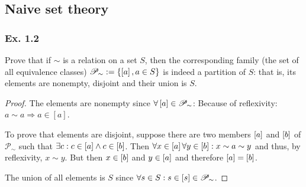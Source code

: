 \subsection{Naive set theory}
\subsubsection{Ex. 1.2}

Prove that if $\sim$ is a relation on a set $S$, then the corresponding family (the set of all equivalence classes) $\mathscr{P}_{\sim} := \left\{\left[a\right], a \in S\right\}
$ is indeed a partition of $S$: that is, its elements are nonempty, disjoint and their union is $S$.

\begin{proof}
    The elements are nonempty since
        $\forall \left[a\right] \in \mathscr{P}_{\sim}$: Because of reflexivity: $a \sim a \Rightarrow a \in [a]$. 
    
    To prove that elements are disjoint, suppose there are two members $\left[a\right]$ and $\left[b\right]$ of $\mathscr{P}_{\sim}$ such that $\exists c: c \in \left[a\right] \wedge c \in \left[b\right]$. Then $\forall x \in \left[a\right] \forall y \in \left[b\right]: x \sim a \sim y$ and thus, by reflexivity, $x \sim y$. But then $x \in \left[b\right]$ and $y \in \left[a\right]$ and therefore $\left[a\right] = \left[b\right]$. 

    The union of all elements is $S$ since $\forall s \in S: s \in \left[s\right] \in \mathscr{P}_{\sim}$.
\end{proof}
